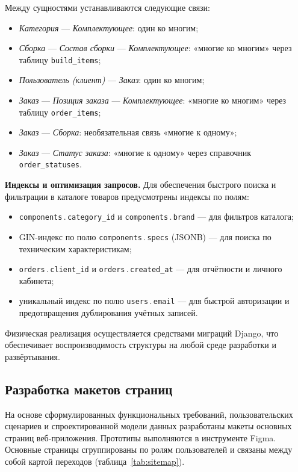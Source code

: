 \documentclass[14pt, a4paper]{extarticle}
\begin{document}
Между сущностями устанавливаются следующие связи:
\begin{itemize}
    \item \emph{Категория} --- \emph{Комплектующее}: один ко многим;
    \item \emph{Сборка} --- \emph{Состав сборки} --- \emph{Комплектующее}: «многие ко многим» через таблицу \texttt{build\_\allowbreak items};
    \item \emph{Пользователь (клиент)} --- \emph{Заказ}: один ко многим;
    \item \emph{Заказ} --- \emph{Позиция заказа} --- \emph{Комплектующее}: «многие ко многим» через таблицу \texttt{order\_\allowbreak items};
    \item \emph{Заказ} --- \emph{Сборка}: необязательная связь «многие к одному»;
    \item \emph{Заказ} --- \emph{Статус заказа}: «многие к одному» через справочник \texttt{order\_\allowbreak statuses}.
\end{itemize}

\textbf{Индексы и оптимизация запросов.} Для обеспечения быстрого поиска и фильтрации в каталоге товаров предусмотрены индексы по полям:
\begin{itemize}
    \item \texttt{components}\,.\,\texttt{category\_id} и \texttt{components}\,.\,\texttt{brand} --- для фильтров каталога;
    \item GIN-индекс по полю \texttt{components}\,.\,\texttt{specs} (JSONB) --- для поиска по техническим характеристикам;
    \item \texttt{orders}\,.\,\texttt{client\_id} и \texttt{orders}\,.\,\texttt{created\_at} --- для отчётности и личного кабинета;
    \item уникальный индекс по полю \texttt{users}\,.\,\texttt{email} --- для быстрой авторизации и предотвращения дублирования учётных записей.
\end{itemize}

Физическая реализация осуществляется средствами миграций Django, что обеспечивает воспроизводимость структуры на любой среде разработки и развёртывания.

\subsection{Разработка макетов страниц}

На основе сформулированных функциональных требований, пользовательских сценариев и спроектированной модели данных разработаны макеты основных страниц веб-приложения. Прототипы выполняются в инструменте Figma. Основные страницы сгруппированы по ролям пользователей и связаны между собой картой переходов (таблица~\ref{tab:sitemap}).
\end{document}
